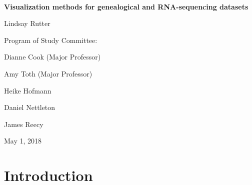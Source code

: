 \documentclass[11pt,a4paper,oldfontcommands,openany]{memoir}
\numberwithin{equation}{section} %
\begin{document}
\sloppy


{
\centering
~\vspace{\fill}

\vspace{2.5cm}



\vspace{1cm}

{\LARGE\textbf{Visualization methods for genealogical and RNA-sequencing datasets}}

\vspace{1cm}

{\LARGE Lindsay Rutter}

\vspace{4cm}

{\LARGE Program of Study Committee:}

\vspace{1cm}

{\LARGE Dianne Cook (Major Professor)}

\vspace{.25cm}

{\LARGE Amy Toth (Major Professor)}

\vspace{.25cm}

{\LARGE Heike Hofmann}

\vspace{.25cm}

{\LARGE Daniel Nettleton}

\vspace{.25cm}

{\LARGE James Reecy}

\vspace{2.5cm}

{\centerline{\large May 1, 2018}}
}

\clearpage

\setsecheadstyle{\Large\bfseries\sffamily\raggedright}
\setsubsecheadstyle{\large\bfseries\sffamily\raggedright}
\setsubsubsecheadstyle{\bfseries\sffamily\raggedright}

\tableofcontents

\setlength{\parskip}{10pt} %

\OnehalfSpacing

\chapter{Introduction}
\end{document}
